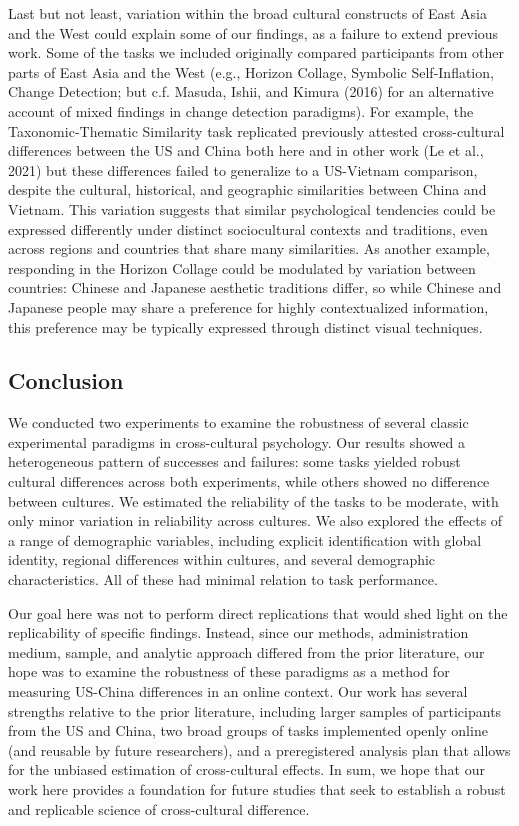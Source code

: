 \documentclass[
  man,floatsintext]{apa6}
\begin{document}
Last but not least, variation within the broad cultural constructs of East Asia and the West could explain some of our findings, as a failure to extend previous work. Some of the tasks we included originally compared participants from other parts of East Asia and the West (e.g., Horizon Collage, Symbolic Self-Inflation, Change Detection; but c.f. Masuda, Ishii, and Kimura (2016) for an alternative account of mixed findings in change detection paradigms). For example, the Taxonomic-Thematic Similarity task replicated previously attested cross-cultural differences between the US and China both here and in other work (Le et al., 2021) but these differences failed to generalize to a US-Vietnam comparison, despite the cultural, historical, and geographic similarities between China and Vietnam. This variation suggests that similar psychological tendencies could be expressed differently under distinct sociocultural contexts and traditions, even across regions and countries that share many similarities. As another example, responding in the Horizon Collage could be modulated by variation between countries: Chinese and Japanese aesthetic traditions differ, so while Chinese and Japanese people may share a preference for highly contextualized information, this preference may be typically expressed through distinct visual techniques.

\hypertarget{conclusion}{%
\subsection{Conclusion}\label{conclusion}}

We conducted two experiments to examine the robustness of several classic experimental paradigms in cross-cultural psychology. Our results showed a heterogeneous pattern of successes and failures: some tasks yielded robust cultural differences across both experiments, while others showed no difference between cultures. We estimated the reliability of the tasks to be moderate, with only minor variation in reliability across cultures. We also explored the effects of a range of demographic variables, including explicit identification with global identity, regional differences within cultures, and several demographic characteristics. All of these had minimal relation to task performance.

Our goal here was not to perform direct replications that would shed light on the replicability of specific findings. Instead, since our methods, administration medium, sample, and analytic approach differed from the prior literature, our hope was to examine the robustness of these paradigms as a method for measuring US-China differences in an online context. Our work has several strengths relative to the prior literature, including larger samples of participants from the US and China, two broad groups of tasks implemented openly online (and reusable by future researchers), and a preregistered analysis plan that allows for the unbiased estimation of cross-cultural effects. In sum, we hope that our work here provides a foundation for future studies that seek to establish a robust and replicable science of cross-cultural difference.
\end{document}
